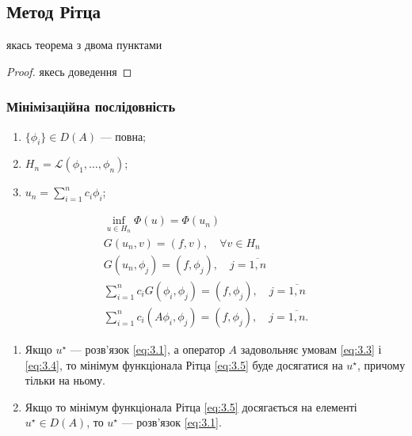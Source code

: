 \subsection{Метод Рітца}
\begin{theorem}
    якась теорема з двома пунктами
\end{theorem}
\begin{proof}
    якесь доведення
\end{proof}

\subsubsection{Мінімізаційна послідовність}

\begin{enumerate}
    \item $\{\phi_i\} \in D(A)$ --- повна;
    \item $H_n = \mathcal{L}(\phi_1, \ldots, \phi_n)$;
    \item $u_n = \sum_{i = 1}^n c_i \phi_i$;
\end{enumerate}

\begin{gather*}
    \inf_{u \in H_n} \Phi(u) = \Phi(u_n) \\
    G(u_n, v) = (f, v), \quad \forall v \in H_n \\
    G(u_n, \phi_j) = (f, \phi_j), \quad j = \overline{1, n} \\ 
    \sum_{i = 1}^n c_i G(\phi_i, \phi_j) = (f, \phi_j), \quad j = \overline{1, n} \\
    \sum_{i = 1}^n c_i (A \phi_i, \phi_j) = (f, \phi_j), \quad j = \overline{1, n}.
\end{gather*}

\begin{theorem}
    \begin{enumerate}
        \item Якщо $u^\star$ --- розв'язок \eqref{eq:3.1}, а оператор $A$ задовольняє умовам \eqref{eq:3.3} і \eqref{eq:3.4}, то мінімум функціонала Рітца \eqref{eq:3.5} буде досягатися на $u^\star$, причому тільки на ньому.
        \item Якщо то мінімум функціонала Рітца \eqref{eq:3.5} досягається на елементі $u^\star \in D(A)$, то $u^\star$ --- розв'язок \eqref{eq:3.1}.
    \end{enumerate}
\end{theorem}

